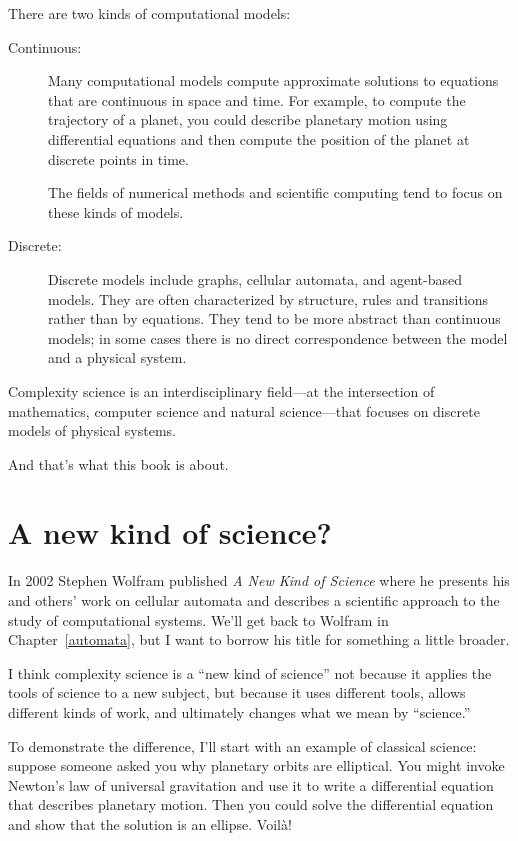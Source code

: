 \documentclass[10pt]{book}
\begin{document}
There are two kinds of computational models:

\begin{description}

\item[Continuous:] Many computational models compute approximate
  solutions to equations that are continuous in space and time.  For
  example, to compute the trajectory of a planet, you could describe
  planetary motion using differential equations and then compute the
  position of the planet at discrete points in time.

The fields of numerical methods and scientific computing
tend to focus on these kinds of models.

\item[Discrete:] Discrete models include graphs, cellular automata,
  and agent-based models.  They are often characterized by structure,
  rules and transitions rather than by equations.  They tend to be
  more abstract than continuous models; in some cases there is no
  direct correspondence between the model and a physical system.

\end{description}

Complexity science is an interdisciplinary field---at the intersection
of mathematics, computer science and natural science---that focuses on
discrete models of physical systems.

And that's what this book is about.


\section{A new kind of science?}

In 2002 Stephen Wolfram published {\em A New Kind of Science} where he
presents his and others' work on cellular automata and describes a
scientific approach to the study of computational systems.  We'll get
back to Wolfram in Chapter~\ref{automata}, but I want to borrow his
title for something a little broader.

I think complexity science is a ``new kind of science'' not because
it applies the tools of science to a new subject, but because it
uses different tools, allows different kinds of work, and ultimately
changes what we mean by ``science.''

To demonstrate the difference, I'll start with an example of classical
science: suppose someone asked you why planetary orbits are
elliptical.  You might invoke Newton's law of universal
gravitation and use it to write a differential equation that describes
planetary motion.  Then you could solve the differential equation and
show that the solution is an ellipse.  Voil\`{a}!
\end{document}
